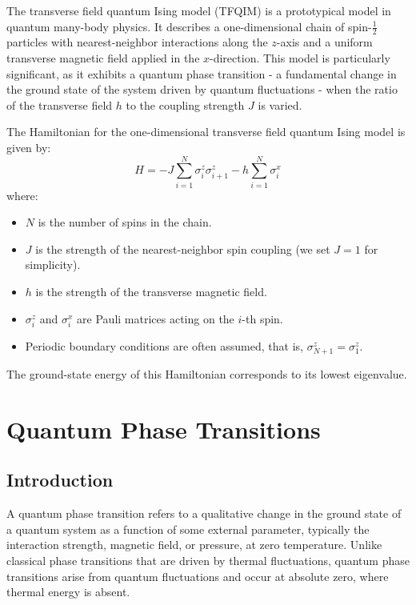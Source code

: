 \documentclass[pre,twocolumn,floatfix]{revtex4-1}
\begin{document}
The transverse field quantum Ising model (TFQIM) is a prototypical model in quantum many-body physics. It describes a one-dimensional chain of spin-$\frac{1}{2}$ particles with nearest-neighbor interactions along the $z$-axis and a uniform transverse magnetic field applied in the $x$-direction. This model is particularly significant, as it exhibits a quantum phase transition - a fundamental change in the ground state of the system driven by quantum fluctuations - when the ratio of the transverse field $h$ to the coupling strength $J$ is varied.

The Hamiltonian for the one-dimensional transverse field quantum Ising model is given by:
\begin{equation}
    H = -J \sum_{i=1}^{N} \sigma_i^{z} \sigma_{i+1}^{z} - h \sum_{i=1}^{N} \sigma_i^{x}
\end{equation}
where:
\begin{itemize}
    \item $N$ is the number of spins in the chain.
    \item $J$ is the strength of the nearest-neighbor spin coupling (we set $J = 1$ for simplicity).
    \item $h$ is the strength of the transverse magnetic field.
    \item $\sigma_i^z$ and $\sigma_i^x$ are Pauli matrices acting on the $i$-th spin.
    \item Periodic boundary conditions are often assumed, that is, $\sigma^z_{N+1} = \sigma^z_1$.
\end{itemize}

The ground-state energy of this Hamiltonian corresponds to its lowest eigenvalue. 




\section{Quantum Phase Transitions} \label{sec:quantum-phase-transitions}%
\subsection{Introduction}
 A quantum phase transition refers to a qualitative change in the ground state of a quantum system as a function of some external parameter, typically the interaction strength, magnetic field, or pressure, at zero temperature. Unlike classical phase transitions that are driven by thermal fluctuations, quantum phase transitions arise from quantum fluctuations and occur at absolute zero, where thermal energy is absent.
\end{document}

